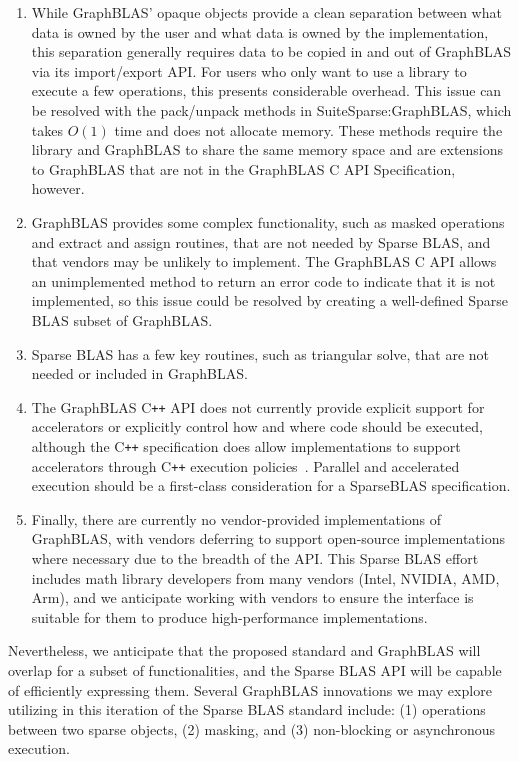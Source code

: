 \documentclass{article}
\newcommand{\cplusplus}{C\texttt{++}\xspace}
\begin{document}
\begin{enumerate}
\item While GraphBLAS' opaque objects
provide a clean separation between what data is owned by the user and what data
is owned by the implementation, this separation generally requires data to be
copied in and out of GraphBLAS via its import/export API.  For users who only
want to use a library to execute a few operations, this presents considerable
overhead.  This issue can be resolved with the pack/unpack methods in
SuiteSparse:GraphBLAS, which takes $O(1)$ time and does not allocate memory. 
These methods require the library and GraphBLAS to share the same memory space
and are extensions to GraphBLAS that are not in the GraphBLAS C API
Specification, however.

\item GraphBLAS provides some complex functionality, such as
masked operations and extract and assign routines, that are not needed by
Sparse BLAS, and that vendors may be unlikely to implement.
The GraphBLAS C API allows an unimplemented method to return an error code to
indicate that it is not implemented, so this issue could be resolved by
creating a well-defined Sparse BLAS subset of GraphBLAS.

\item Sparse
BLAS has a few key routines, such as triangular solve, that are not needed or
included in GraphBLAS.  

\item
The GraphBLAS \cplusplus API does not currently provide explicit support
for accelerators or explicitly control how and where code should be
executed, although the \cplusplus specification does allow
implementations to support accelerators through \cplusplus execution
policies~\cite{9150467,graphblascppspec}. Parallel and accelerated
execution should be a first-class consideration for a SparseBLAS
specification.

\item
Finally, there are currently no vendor-provided implementations of GraphBLAS, with vendors deferring to support open-source implementations where necessary due to the breadth of the API.  This Sparse BLAS effort includes math library developers from many vendors (Intel, NVIDIA, AMD, Arm), and we anticipate working with vendors to ensure the interface is suitable for them to produce high-performance implementations.

\end{enumerate}

Nevertheless, we anticipate that the proposed standard and GraphBLAS will overlap for a subset of functionalities, and the Sparse BLAS API will be capable of efficiently expressing them. Several GraphBLAS innovations we may explore utilizing in this iteration of the Sparse BLAS standard include: (1) operations between two sparse objects, (2) masking, and (3) non-blocking or asynchronous execution.
\end{document}

